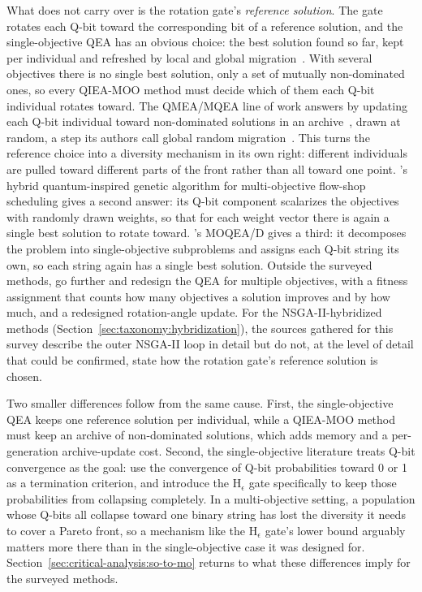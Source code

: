 What does not carry over is the rotation gate's \emph{reference
solution}. The gate rotates each Q-bit toward the corresponding bit of a
reference solution, and the single-objective QEA has an obvious choice:
the best solution found so far, kept per individual and refreshed by
local and global migration~\citep{han2002qea}. With several objectives
there is no single best solution, only a set of mutually non-dominated
ones, so every QIEA-MOO method must decide which of them each Q-bit
individual rotates toward. The QMEA/MQEA line of work answers by
updating each Q-bit individual toward non-dominated solutions in an
archive~\citep{kim2009mqea}, drawn at random, a step its authors call
global random migration~\citep{ryu2014dmqea}. This turns
the reference choice into a diversity mechanism in its own right:
different individuals are pulled toward different parts of the front
rather than all toward one point. \citet{li2007hqga}'s hybrid
quantum-inspired genetic algorithm for multi-objective flow-shop
scheduling gives a second answer: its Q-bit component scalarizes the
objectives with randomly drawn weights, so that for each weight vector
there is again a single best solution to rotate toward.
\citet{deng2024moqead}'s MOQEA/D gives a third: it decomposes the
problem into single-objective subproblems and assigns each Q-bit string
its own, so each string again has a single best solution. Outside the
surveyed methods, \citet{ho2013vectorqea} go further and redesign the
QEA for multiple objectives, with a fitness assignment that counts how
many objectives a solution improves and by how much, and a redesigned
rotation-angle update. For the
NSGA-II-hybridized methods
(Section~\ref{sec:taxonomy:hybridization}), the sources gathered for
this survey describe the outer NSGA-II loop in detail but do not, at
the level of detail that could be confirmed, state how the rotation gate's
reference solution is chosen.

Two smaller differences follow from the same cause. First, the
single-objective QEA keeps one reference solution per individual, while
a QIEA-MOO method must keep an archive of non-dominated solutions, which
adds memory and a per-generation archive-update cost. Second, the
single-objective literature treats Q-bit convergence as the goal:
\citet{han2004hepsilon} use the convergence of Q-bit probabilities
toward 0 or 1 as a termination criterion, and introduce the
H$_\epsilon$ gate specifically to keep those probabilities from
collapsing completely. In a multi-objective setting, a population
whose Q-bits all collapse toward one binary string has lost the
diversity it needs to cover a Pareto front, so a mechanism like the
H$_\epsilon$ gate's lower bound arguably matters more there than in the
single-objective case it was designed for. Section~\ref{sec:critical-analysis:so-to-mo}
returns to what these differences imply for the surveyed methods.

